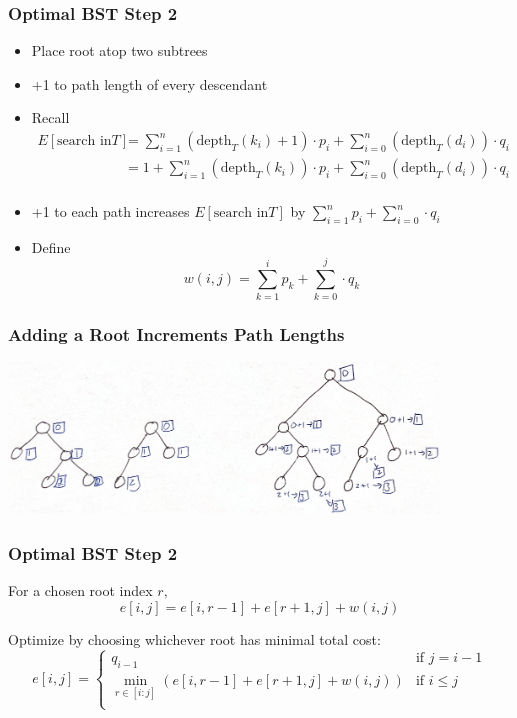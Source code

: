 \documentclass[10pt,aspectratio=169]{beamer}
\begin{document}
\begin{frame} \frametitle{Optimal BST Step 2}
  \begin{itemize}
    \item Place root atop two subtrees
    \item +1 to path length of every descendant
    \item Recall
      \begin{align*}
        E[\text{search in} T] & = \sum_{i=1}^n (\text{depth}_T(k_i)+1) \cdot p_i + \sum_{i=0}^n (\text{depth}_T(d_i)) \cdot q_i \\
          & = 1 + \sum_{i=1}^n (\text{depth}_T(k_i)) \cdot p_i + \sum_{i=0}^n (\text{depth}_T(d_i)) \cdot q_i \\
      \end{align*}
    \item +1 to each path increases $E[\text{search in} T]$ by
      $ \sum_{i=1}^n p_i + \sum_{i=0}^n \cdot q_i $
    \item Define
      \[ w(i, j) = \sum_{k=1}^i p_k + \sum_{k=0}^j \cdot q_k \]
    \end{itemize}
\end{frame}

\begin{frame} \frametitle{Adding a Root Increments Path Lengths}
\begin{center}
  \includegraphics[width=4.5in]{add_root.png}
\end{center}
\end{frame}

\begin{frame} \frametitle{Optimal BST Step 2}
  For a chosen root index $r,$
  \[ e[i, j] = e[i, r-1] + e[r+1, j] + w(i, j) \]

  Optimize by choosing whichever root has minimal total cost:
  \[
    e[i, j] = 
        \begin{cases}
          q_{i-1} & \text{if } j=i-1 \\
          \min_{r \in [i:j]} (e[i, r-1] + e[r+1, j] + w(i, j)) & \text{if } i \leq j \\
        \end{cases} 
  \]
\end{frame}
\end{document}

